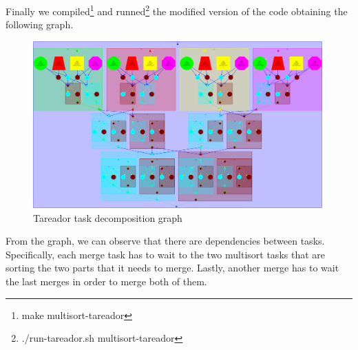\documentclass{article}
\begin{document}
\justify
Finally we compiled\footnote{make multisort-tareador} and runned\footnote{./run-tareador.sh multisort-tareador}
the modified version of the code obtaining the following graph.
\begin{figure}[h!]
    \centering
    \includegraphics[width=0.99\textwidth]{tareador1.png}
    \caption{Tareador task decomposition graph}
    \label{fig:tareador}
\end{figure}
\justify
From the graph, we can observe that there are dependencies between tasks.
Specifically, each merge task has to wait to the two multisort tasks that are sorting the two parts that it needs to merge. Lastly, another merge has to wait the last merges in order to merge both of them.
\clearpage
\end{document}

